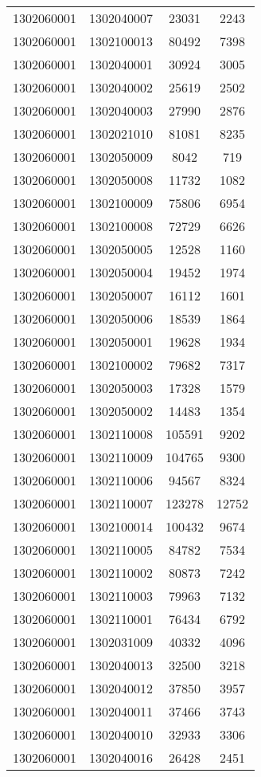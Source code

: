 \begin{longtable}{llcc}
1302060001 & 1302040007 & 23031 & 2243\\
1302060001 & 1302100013 & 80492 & 7398\\
1302060001 & 1302040001 & 30924 & 3005\\
1302060001 & 1302040002 & 25619 & 2502\\
1302060001 & 1302040003 & 27990 & 2876\\
1302060001 & 1302021010 & 81081 & 8235\\
1302060001 & 1302050009 & 8042 & 719\\
1302060001 & 1302050008 & 11732 & 1082\\
1302060001 & 1302100009 & 75806 & 6954\\
1302060001 & 1302100008 & 72729 & 6626\\
1302060001 & 1302050005 & 12528 & 1160\\
1302060001 & 1302050004 & 19452 & 1974\\
1302060001 & 1302050007 & 16112 & 1601\\
1302060001 & 1302050006 & 18539 & 1864\\
1302060001 & 1302050001 & 19628 & 1934\\
1302060001 & 1302100002 & 79682 & 7317\\
1302060001 & 1302050003 & 17328 & 1579\\
1302060001 & 1302050002 & 14483 & 1354\\
1302060001 & 1302110008 & 105591 & 9202\\
1302060001 & 1302110009 & 104765 & 9300\\
1302060001 & 1302110006 & 94567 & 8324\\
1302060001 & 1302110007 & 123278 & 12752\\
1302060001 & 1302100014 & 100432 & 9674\\
1302060001 & 1302110005 & 84782 & 7534\\
1302060001 & 1302110002 & 80873 & 7242\\
1302060001 & 1302110003 & 79963 & 7132\\
1302060001 & 1302110001 & 76434 & 6792\\
1302060001 & 1302031009 & 40332 & 4096\\
1302060001 & 1302040013 & 32500 & 3218\\
1302060001 & 1302040012 & 37850 & 3957\\
1302060001 & 1302040011 & 37466 & 3743\\
1302060001 & 1302040010 & 32933 & 3306\\
1302060001 & 1302040016 & 26428 & 2451\\

\end{longtable}

